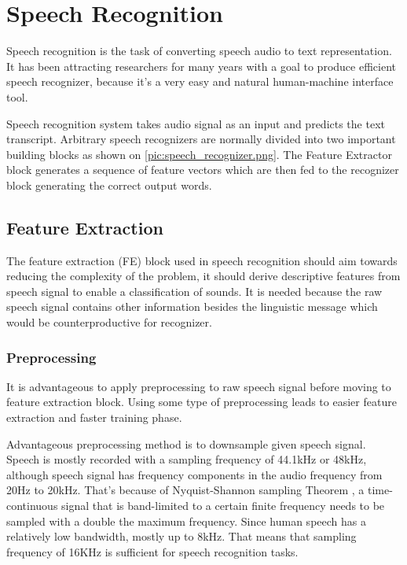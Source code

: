 \chapter{Speech Recognition}

Speech recognition is the task of converting speech audio to text representation.
It has been attracting researchers for many years with a goal to produce efficient speech recognizer, because it's a very easy and natural human-machine interface tool.

Speech recognition system takes audio signal as an input and predicts the text transcript.
Arbitrary speech recognizers are normally divided into two important building blocks as shown on \ref{pic:speech_recognizer.png}.
The Feature Extractor block generates a sequence of feature vectors which are then fed to the recognizer block generating the correct output words.


\section{Feature Extraction}

The feature extraction (FE) block used in speech recognition should aim towards reducing the complexity of the problem,
it should derive descriptive features from speech signal to enable a classification of sounds.
It is needed because the raw speech signal contains other information besides the linguistic message which would be counterproductive for recognizer.



\subsection{Preprocessing}

It is advantageous to apply preprocessing to raw speech signal before moving to feature extraction block.
Using some type of preprocessing leads to easier feature extraction and faster training phase.

Advantageous preprocessing method is to downsample given speech signal.
Speech is mostly recorded with a sampling frequency of 44.1kHz or 48kHz, although speech signal has frequency components in the audio frequency from 20Hz to 20kHz\cite{range_speech}.
That's because of Nyquist-Shannon sampling Theorem \cite{shannon}, a time-continuous signal that is band-limited to a certain finite frequency needs to be sampled with a double the maximum frequency.
Since human speech has a relatively low bandwidth, mostly up to 8kHz.
That means that sampling frequency of 16KHz is sufficient for speech recognition tasks\cite{speech_preprocessing}.

